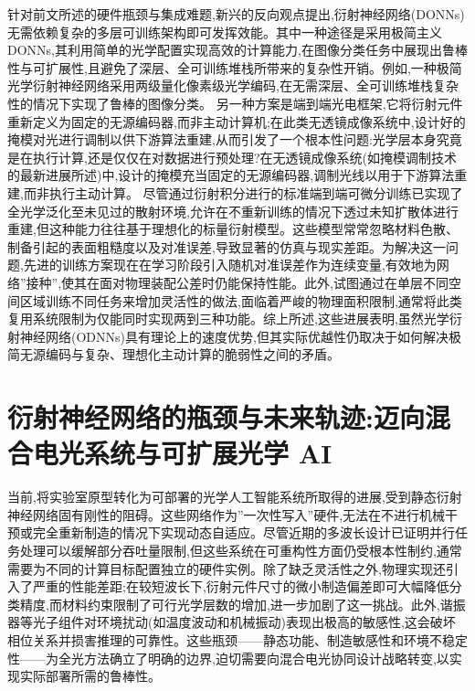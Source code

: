 \documentclass[11pt]{article}
\begin{document}
针对前文所述的硬件瓶颈与集成难题,新兴的反向观点提出,衍射神经网络(DONNs)无需依赖复杂的多层可训练架构即可发挥效能。其中一种途径是采用极简主义 DONNs,其利用简单的光学配置实现高效的计算能力,在图像分类任务中展现出鲁棒性与可扩展性,且避免了深层、全可训练堆栈所带来的复杂性开销。例如,一种极简光学衍射神经网络采用两级量化像素级光学编码,在无需深层、全可训练堆栈复杂性的情况下实现了鲁棒的图像分类。\citep{doi_10_1002_lpor_202402303_1f555bd4} 另一种方案是端到端光电框架,它将衍射元件重新定义为固定的无源编码器,而非主动计算机;在此类无透镜成像系统中,设计好的掩模对光进行调制以供下游算法重建,从而引发了一个根本性问题:光学层本身究竟是在执行计算,还是仅仅在对数据进行预处理?在无透镜成像系统(如掩模调制技术的最新进展所述)中,设计的掩模充当固定的无源编码器,调制光线以用于下游算法重建,而非执行主动计算。\citep{doi_10_3390_electronics13030617_5b341306} 尽管通过衍射积分进行的标准端到端可微分训练已实现了全光学泛化至未见过的散射环境,允许在不重新训练的情况下透过未知扩散体进行重建,但这种能力往往基于理想化的标量衍射模型。这些模型常常忽略材料色散、制备引起的表面粗糙度以及对准误差,导致显著的仿真与现实差距。为解决这一问题,先进的训练方案现在在学习阶段引入随机对准误差作为连续变量,有效地为网络''接种'',使其在面对物理装配公差时仍能保持性能。此外,试图通过在单层不同空间区域训练不同任务来增加灵活性的做法,面临着严峻的物理面积限制,通常将此类复用系统限制为仅能同时实现两到三种功能。综上所述,这些进展表明,虽然光学衍射神经网络(ODNNs)具有理论上的速度优势,但其实际优越性仍取决于如何解决极简无源编码与复杂、理想化主动计算的脆弱性之间的矛盾。\citep{doi_10_1038_s41377_022_00725_8_57c4c704} \citep{doi_10_1002_lpor_202402303_1f555bd4} \citep{doi_10_48550_arxiv_2411_05748_a91b6f61} \citep{doi_10_3390_electronics13030617_5b341306} \citep{doi_10_1515_nanoph_2020_0291_c4a9f42d}

\section{衍射神经网络的瓶颈与未来轨迹:迈向混合电光系统与可扩展光学 AI}\label{ux884dux5c04ux795eux7ecfux7f51ux7edcux7684ux74f6ux9888ux4e0eux672aux6765ux8f68ux8ff9ux8fc8ux5411ux6df7ux5408ux7535ux5149ux7cfbux7edfux4e0eux53efux6269ux5c55ux5149ux5b66-ai}

当前,将实验室原型转化为可部署的光学人工智能系统所取得的进展,受到静态衍射神经网络固有刚性的阻碍。这些网络作为''一次性写入''硬件,无法在不进行机械干预或完全重新制造的情况下实现动态自适应。尽管近期的多波长设计已证明并行任务处理可以缓解部分吞吐量限制,但这些系统在可重构性方面仍受根本性制约,通常需要为不同的计算目标配置独立的硬件实例。除了缺乏灵活性之外,物理实现还引入了严重的性能差距;在较短波长下,衍射元件尺寸的微小制造偏差即可大幅降低分类精度,而材料约束限制了可行光学层数的增加,进一步加剧了这一挑战。\citep{doi_10_1109_tmag_2023_3281842_3e98eb7f}此外,谐振器等光子组件对环境扰动(如温度波动和机械振动)表现出极高的敏感性,这会破坏相位关系并损害推理的可靠性。这些瓶颈------静态功能、制造敏感性和环境不稳定性------为全光方法确立了明确的边界,迫切需要向混合电光协同设计战略转变,以实现实际部署所需的鲁棒性。\citep{doi_10_1515_nanoph_2022_0615_9a3be8d6} \citep{doi_10_1002_adpr_202300310_6647aa64} \citep{doi_10_3390_nano14080697_c372a140} \citep{doi_10_1002_nap2_70185_56c8ab30}
\end{document}
